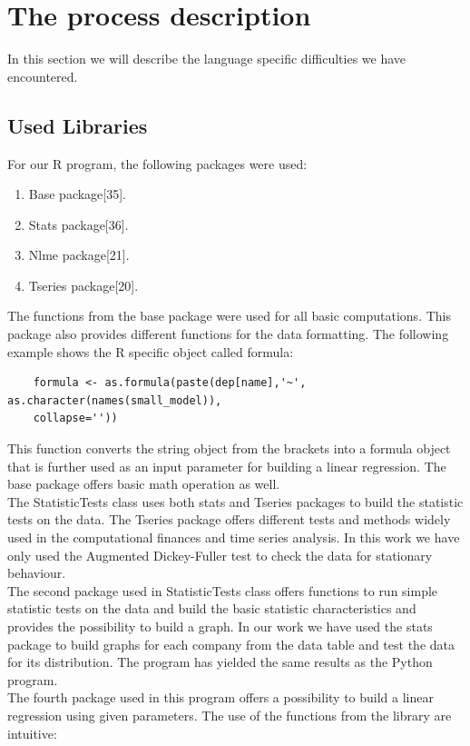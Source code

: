 \documentclass[
  twoside,
  11pt, a4paper,
  footinclude=true,
  headinclude=true,
  cleardoublepage=empty
]{scrreprt}
\begin{document}
    \section{The process description}
    In this section we will describe the language specific difficulties we have encountered.
    \subsection{Used Libraries}
    For our R program, the following packages were used:
    \begin{enumerate}
        \item Base package[35].
        \item Stats package[36].
        \item Nlme package[21].
        \item Tseries package[20].
    \end{enumerate}
    The functions from the base package were used for all basic computations. This package also provides different functions for the data formatting. The following example shows the R specific object called formula:
    \begin{verbatim}
    formula <- as.formula(paste(dep[name],'~', as.character(names(small_model)),
    collapse=''))
    \end{verbatim}
    This function converts the string object from the brackets into a formula object that is further used as an input parameter for building a linear regression. The base package offers basic math operation as well.\\
    The StatisticTests class uses both stats and Tseries packages to build the statistic tests on the data. The Tseries package offers different tests and methods widely used in the computational finances and time series analysis. In this work we have only used the Augmented Dickey-Fuller test to check the data for stationary behaviour.\\
    The second package used in StatisticTests class offers functions to run simple statistic tests on the data and build the basic statistic characteristics and provides the possibility to build a graph. In our work we have used the stats package to build graphs for each company from the data table and test the data for its distribution. The program has yielded the same results as the Python program.\\
    The fourth package used in this program offers a possibility to build a linear regression using given parameters. The use of the functions from the library are intuitive:
\end{document}
